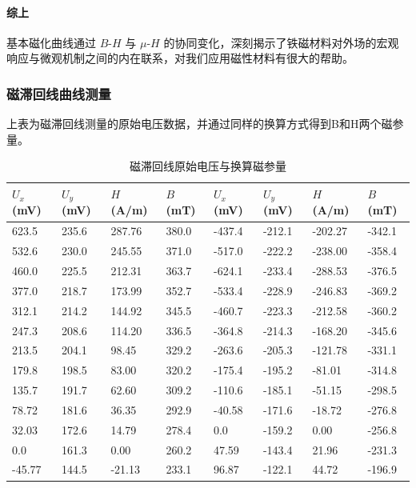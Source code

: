\documentclass[]{../../templates/Report}%
\begin{document}
\begin{fullreportonly}
\paragraph{综上}基本磁化曲线通过 $B$-$H$ 与 $\mu$-$H$ 的协同变化，深刻揭示了铁磁材料对外场的宏观响应与微观机制之间的内在联系，对我们应用磁性材料有很大的帮助。


\subsubsection{磁滞回线曲线测量}
上表为磁滞回线测量的原始电压数据，并通过同样的换算方式得到B和H两个磁参量。

\begin{table}[H]
    \centering
    \caption{磁滞回线原始电压与换算磁参量}
    \scriptsize
    \setlength{\tabcolsep}{2.8pt}
    \begin{tabularx}{\textwidth}{XXXX|XXXX}
        \toprule
        $U_x$ (mV) & $U_y$ (mV) & $H$ (A/m) & $B$ (mT) & $U_x$ (mV) & $U_y$ (mV) & $H$ (A/m) & $B$ (mT) \\
        \midrule
        623.5 & 235.6 & 287.76 & 380.0 & -437.4 & -212.1 & -202.27 & -342.1 \\
        532.6 & 230.0 & 245.55 & 371.0 & -517.0 & -222.2 & -238.00 & -358.4 \\
        460.0 & 225.5 & 212.31 & 363.7 & -624.1 & -233.4 & -288.53 & -376.5 \\
        377.0 & 218.7 & 173.99 & 352.7 & -533.4 & -228.9 & -246.83 & -369.2 \\
        312.1 & 214.2 & 144.92 & 345.5 & -460.7 & -223.3 & -212.58 & -360.2 \\
        247.3 & 208.6 & 114.20 & 336.5 & -364.8 & -214.3 & -168.20 & -345.6 \\
        213.5 & 204.1 & 98.45 & 329.2 & -263.6 & -205.3 & -121.78 & -331.1 \\
        179.8 & 198.5 & 83.00 & 320.2 & -175.4 & -195.2 & -81.01 & -314.8 \\
        135.7 & 191.7 & 62.60 & 309.2 & -110.6 & -185.1 & -51.15 & -298.5 \\
        78.72 & 181.6 & 36.35 & 292.9 & -40.58 & -171.6 & -18.72 & -276.8 \\
        32.03 & 172.6 & 14.79 & 278.4 & 0.0 & -159.2 & 0.00 & -256.8 \\
        0.0 & 161.3 & 0.00 & 260.2 & 47.59 & -143.4 & 21.96 & -231.3 \\
        -45.77 & 144.5 & -21.13 & 233.1 & 96.87 & -122.1 & 44.72 & -196.9 \\

\end{tabularx}
\end{table}
\end{fullreportonly}
\end{document}
